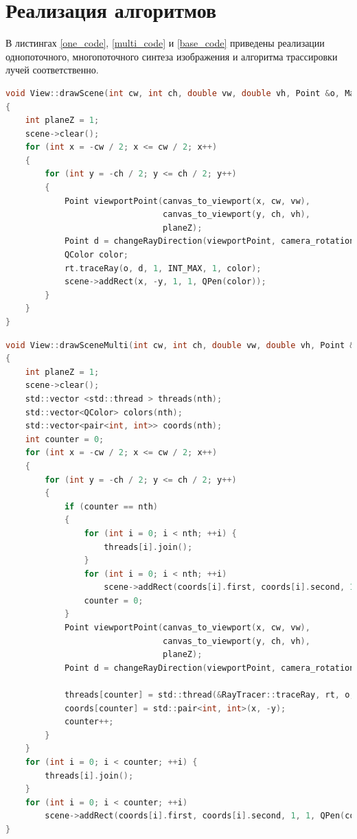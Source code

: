 \documentclass[12pt]{report}
\begin{document}
\section{Реализация алгоритмов}

В листингах \ref{one_code}, \ref{multi_code} и \ref{base_code} приведены реализации однопоточного, многопоточного синтеза изображения и алгоритма трассировки лучей соответственно.

\begin{lstlisting}[label=one_code,caption=Однопоточный синтез изображения,language=C]
void View::drawScene(int cw, int ch, double vw, double vh, Point &o, Matrix<double> &camera_rotation)
{
    int planeZ = 1;
    scene->clear();
    for (int x = -cw / 2; x <= cw / 2; x++)
    {
        for (int y = -ch / 2; y <= ch / 2; y++)
        {
            Point viewportPoint(canvas_to_viewport(x, cw, vw),
                                canvas_to_viewport(y, ch, vh),
                                planeZ);
            Point d = changeRayDirection(viewportPoint, camera_rotation);
            QColor color;
            rt.traceRay(o, d, 1, INT_MAX, 1, color);
            scene->addRect(x, -y, 1, 1, QPen(color));
        }
    }
}

\end{lstlisting}
\newpage
\begin{lstlisting}[label=multi_code,caption=Многопоточный синтез изображения,language=C]
void View::drawSceneMulti(int cw, int ch, double vw, double vh, Point &o, Matrix<double> &camera_rotation, int nth)
{
    int planeZ = 1;
    scene->clear();
    std::vector <std::thread > threads(nth);
    std::vector<QColor> colors(nth);
    std::vector<pair<int, int>> coords(nth);
    int counter = 0;
    for (int x = -cw / 2; x <= cw / 2; x++)
    {
        for (int y = -ch / 2; y <= ch / 2; y++)
        {
            if (counter == nth)
            {
                for (int i = 0; i < nth; ++i) {
                    threads[i].join();
                }
                for (int i = 0; i < nth; ++i)
                    scene->addRect(coords[i].first, coords[i].second, 1, 1, QPen(colors[i]));
                counter = 0;
            }
            Point viewportPoint(canvas_to_viewport(x, cw, vw),
                                canvas_to_viewport(y, ch, vh),
                                planeZ);
            Point d = changeRayDirection(viewportPoint, camera_rotation);

            threads[counter] = std::thread(&RayTracer::traceRay, rt, o, d, 1, INT_MAX, 1, std::ref(colors[counter]));
            coords[counter] = std::pair<int, int>(x, -y);
            counter++;
        }
    }
    for (int i = 0; i < counter; ++i) {
        threads[i].join();
    }
    for (int i = 0; i < counter; ++i)
        scene->addRect(coords[i].first, coords[i].second, 1, 1, QPen(colors[i]));
}
\end{lstlisting}
\end{document}
